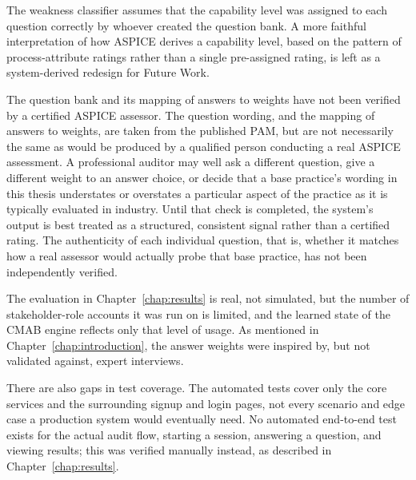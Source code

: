 \documentclass[a4paper, 12pt, oneside, openany, BCOR1cm,toc=chapterentrywithdots]{scrbook}
\begin{document}
The weakness classifier assumes that the capability level was assigned to each question
correctly by whoever created the question bank. A more faithful interpretation of how ASPICE
derives a capability level, based on the pattern of process-attribute ratings rather than a
single pre-assigned rating, is left as a system-derived redesign for Future Work.

The question bank and its mapping of answers to weights have not been verified by a certified
ASPICE assessor. The question wording, and the mapping of answers to weights, are taken from the
published PAM, but are not necessarily the same as would be produced by a qualified person
conducting a real ASPICE assessment. A professional auditor may well ask a different question,
give a different weight to an answer choice, or decide that a base practice's wording in this
thesis understates or overstates a particular aspect of the practice as it is typically
evaluated in industry. Until that check is completed, the system's output is best treated as a
structured, consistent signal rather than a certified rating. The authenticity of each
individual question, that is, whether it matches how a real assessor would actually probe that
base practice, has not been independently verified.

The evaluation in Chapter~\ref{chap:results} is real, not simulated, but the number of
stakeholder-role accounts it was run on is limited, and the learned state of the CMAB engine
reflects only that level of usage. As mentioned in Chapter~\ref{chap:introduction}, the answer
weights were inspired by, but not validated against, expert interviews.

There are also gaps in test coverage. The automated tests cover only the core services and the
surrounding signup and login pages, not every scenario and edge case a production system would
eventually need. No automated end-to-end test exists for the actual audit flow, starting a
session, answering a question, and viewing results; this was verified manually instead, as
described in Chapter~\ref{chap:results}.
\end{document}
